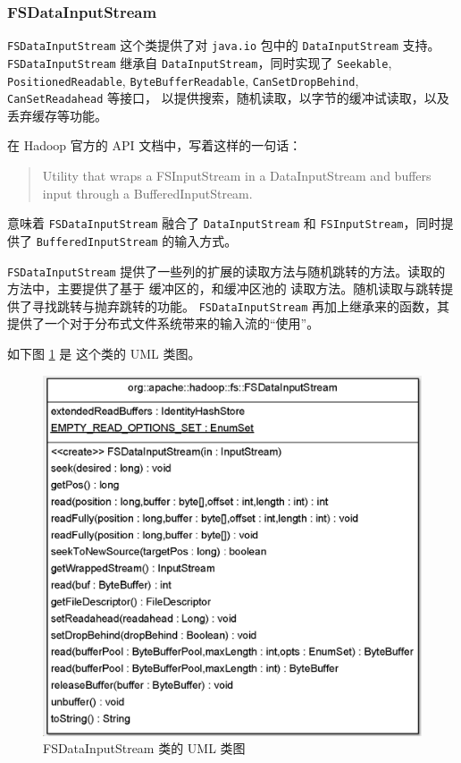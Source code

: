 
\subsubsection{FSDataInputStream}
\label{sec:uml:input:fsdatainputstream}

\lstinline{FSDataInputStream} 这个类提供了对 \lstinline|java.io| 包中的 \lstinline|DataInputStream| 支持。
\lstinline{FSDataInputStream} 继承自 \lstinline|DataInputStream|，同时实现了 \lstinline|Seekable|, \lstinline|PositionedReadable|, \lstinline|ByteBufferReadable|, \lstinline|CanSetDropBehind|, \lstinline|CanSetReadahead| 等接口，
以提供搜索，随机读取，以字节的缓冲试读取，以及丢弃缓存等功能。

在 Hadoop 官方的 API 文档中，写着这样的一句话：
\begin{quote}
    Utility that wraps a FSInputStream in a DataInputStream and buffers input through a BufferedInputStream.
\end{quote}
意味着 \lstinline|FSDataInputStream| 融合了 \lstinline|DataInputStream| 和 \lstinline|FSInputStream|，同时提供了
\lstinline|BufferedInputStream| 的输入方式。

\lstinline|FSDataInputStream| 提供了一些列的扩展的读取方法与随机跳转的方法。读取的方法中，主要提供了基于 缓冲区的，和缓冲区池的
读取方法。随机读取与跳转提供了寻找跳转与抛弃跳转的功能。
\lstinline|FSDataInputStream| 再加上继承来的函数，其提供了一个对于分布式文件系统带来的输入流的“使用”。

如下图 \ref{fig:fsdatainputstream} 是 这个类的 UML 类图。
\begin{figure}[h]
\centering
\includegraphics[width=1\linewidth]{fsdatainputstream}
\caption{FSDataInputStream 类的 UML 类图}
\label{fig:fsdatainputstream}
\end{figure}


